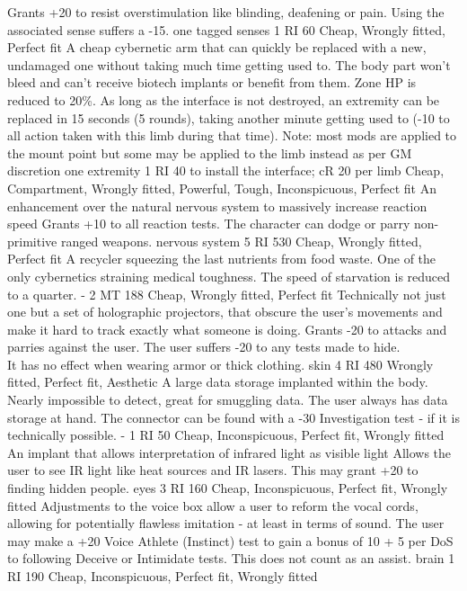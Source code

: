 \begin{multicols}{2}
    {Grants +20 to resist overstimulation like blinding, deafening or pain. Using the associated sense suffers a -15.}
    {one tagged senses}
    {1 RI}
    {60}
    {Cheap, Wrongly fitted, Perfect fit}
    {A cheap cybernetic arm that can quickly be replaced with a new, undamaged one without taking much time getting used to.}
    {The body part won't bleed and can't receive biotech implants or benefit from them.
	   Zone HP is reduced to 20\%. As long as the interface is not destroyed, an extremity can be replaced in 15 seconds (5 rounds), taking another minute getting used to (-10 to all action taken with this limb during that time).
	   Note: most mods are applied to the mount point but some may be applied to the limb instead as per GM discretion}
    {one extremity}
    {1 RI}
    {40 to install the interface; cR 20 per limb}
    {Cheap, Compartment, Wrongly fitted, Powerful, Tough, Inconspicuous, Perfect fit}
    {An enhancement over the natural nervous system to massively increase reaction speed}
    {Grants +10 to all reaction tests. The character can dodge or parry non-primitive ranged weapons.}
    {nervous system}
    {5 RI}
    {530}
    {Cheap, Wrongly fitted, Perfect fit}
    {A recycler squeezing the last nutrients from food waste. One of the only cybernetics straining medical toughness.}
    {The speed of starvation is reduced to a quarter.}
    {-}
    {2 MT}
    {188}
    {Cheap, Wrongly fitted, Perfect fit}
    {Technically not just one but a set of holographic projectors,
    	that obscure the user's movements and make it hard to track exactly what someone is doing.}
    {Grants -20 to attacks and parries against the user.
       The user suffers -20 to any tests made to hide. \\
	   It has no effect when wearing armor or thick clothing.}
    {skin}
    {4 RI}
    {480}
    {Wrongly fitted, Perfect fit, Aesthetic}
    {A large data storage implanted within the body. Nearly impossible to detect, great for smuggling data.}
    {The user always has data storage at hand. The connector can be found with a -30 Investigation test - if it is technically possible.}
    {-}
    {1 RI}
    {50}
    {Cheap, Inconspicuous, Perfect fit, Wrongly fitted}
    {An implant that allows interpretation of infrared light as visible light}
    {Allows the user to see IR light like heat sources and IR lasers.
        This may grant +20 to finding hidden people.}
    {eyes}
    {3 RI}
    {160}
    {Cheap, Inconspicuous, Perfect fit, Wrongly fitted}
    {Adjustments to the voice box allow a user to reform the vocal cords, allowing for potentially flawless imitation - at least in terms of sound.}
    {The user may make a +20 Voice Athlete (Instinct) test to gain a bonus of 10 + 5 per DoS to following Deceive or Intimidate tests. This does not count as an assist.}
    {brain}
    {1 RI}
    {190}
    {Cheap, Inconspicuous, Perfect fit, Wrongly fitted}
\end{multicols}
